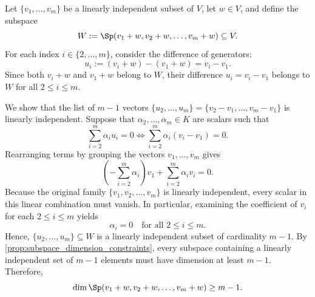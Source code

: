 \begin{exercisesolution}
\label{sol:shifted_span_dimension}
Let $\{v_1, \dots, v_m\}$ be a linearly independent subset of $V$, let $w \in V$, and define the subspace
\[
    W := \Sp(v_1 + w, v_2 + w, \dots, v_m + w) \subseteq V.
\]
For each index $i \in \{2, \dots, m\}$, consider the difference of generators:
\[
    u_i := (v_i + w) - (v_1 + w) = v_i - v_1.
\]
Since both $v_i + w$ and $v_1 + w$ belong to $W$, their difference $u_i = v_i - v_1$ belongs to $W$ for all $2 \le i \le m$.

We show that the list of $m - 1$ vectors $\{u_2, \dots, u_m\} = \{v_2 - v_1, \dots, v_m - v_1\}$ is linearly independent. Suppose that $\alpha_2, \dots, \alpha_m \in K$ are scalars such that
\[
    \sum_{i=2}^m \alpha_i u_i = 0 \iff \sum_{i=2}^m \alpha_i (v_i - v_1) = 0.
\]
Rearranging terms by grouping the vectors $v_1, \dots, v_m$ gives
\[
    \left( -\sum_{i=2}^m \alpha_i \right) v_1 + \sum_{i=2}^m \alpha_i v_i = 0.
\]
Because the original family $\{v_1, v_2, \dots, v_m\}$ is linearly independent, every scalar in this linear combination must vanish. In particular, examining the coefficient of $v_i$ for each $2 \le i \le m$ yields
\[
    \alpha_i = 0 \quad \text{for all } 2 \le i \le m.
\]
Hence, $\{u_2, \dots, u_m\} \subseteq W$ is a linearly independent subset of cardinality $m - 1$. By \cref{prop:subspace_dimension_constraints}, every subspace containing a linearly independent set of $m - 1$ elements must have dimension at least $m - 1$. Therefore,
\[
    \dim \Sp(v_1 + w, v_2 + w, \dots, v_m + w) \ge m - 1.
\]
\end{exercisesolution}


